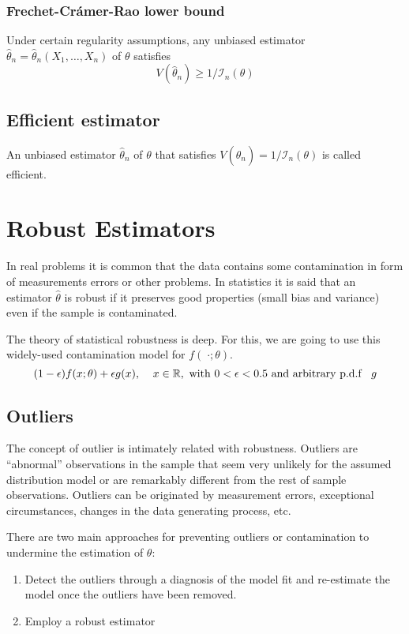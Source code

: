 \subsubsection{Frechet-Cr\'amer-Rao lower bound}
Under certain regularity assumptions, any
unbiased estimator $\hat{\theta}_n=\hat{\theta}_n(X_1,\dots,X_n)$ of $\theta$
satisfies
\[ V(\hat{\theta}_n) \geq 1 / \mathcal{I}_n(\theta)\]

\subsection{Efficient estimator}
An unbiased estimator $\hat{\theta}_n$ of $\theta$ that satisfies
$V(\hat{\theta}_n)=1 / \mathcal{I}_n(\theta)$ is called efficient.

\section{Robust Estimators}
In real problems it is common that the data contains some contamination in form
of measurements errors or other problems. In statistics it is said that an
estimator $\hat{\theta}$ is robust if it preserves good properties (small bias
and variance) even if the sample is contaminated.

The theory of statistical robustness is deep. For this, we are going to use this
widely-used contamination model for $f(\;\cdot;\theta)$.
\[ (1-\epsilon)f(x;\theta) + \epsilon g(x),\;\;\;\; x \in \mathbb{R},\\
\text{ with } 0<\epsilon<0.5 \\ \text{ and arbitrary p.d.f }\;\; g\]

\subsection{Outliers}
The concept of outlier is intimately related with robustness. Outliers are
“abnormal” observations in the sample that seem very unlikely for the assumed
distribution model or are remarkably different from the rest of sample
observations. Outliers can be originated by measurement errors, exceptional
circumstances, changes in the data generating process, etc.

There are two main approaches for preventing outliers or contamination to
undermine the estimation of $\theta$:
\begin{enumerate}
    \item Detect the outliers through a diagnosis of the model fit and
    re-estimate the model once the outliers have been removed.
    \item Employ a robust estimator
\end{enumerate}

